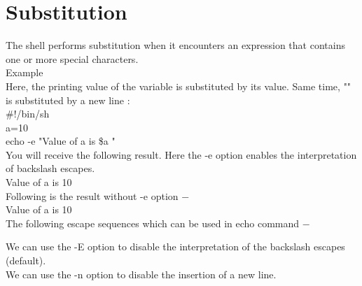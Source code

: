 \documentclass{article}
\begin{document}
\section*{Substitution}
The shell performs substitution when it encounters an expression that contains one or more special characters.\\
Example\\
Here, the printing value of the variable is substituted by its value. Same time, "\n" is substituted by a new line :\\
\#!/bin/sh\\
a=10\\
echo -e "Value of a is \$a \n"\\
You will receive the following result. Here the -e option enables the interpretation of backslash escapes.\\
Value of a is 10\\
Following is the result without -e option −\\
Value of a is 10\n\\
The following escape sequences which can be used in echo command −\\
\begin{center}
\end{center}
We can use the -E option to disable the interpretation of the backslash escapes (default).\\
We can use the -n option to disable the insertion of a new line.\\
\end{document}
